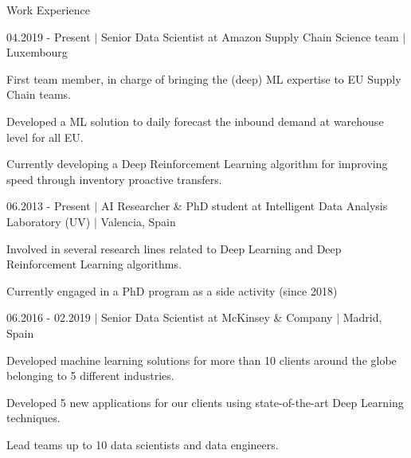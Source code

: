 \documentclass{resume} %
\begin{document}
\begin{rSection}{Work Experience} \itemsep -1pt
\begin{rSubsection}{04.2019 - Present $|$ Senior Data Scientist at Amazon Supply Chain Science team  $|$  \textnormal{Luxembourg}}{}{}

	\vspace{-3pt}

	\item First team member, in charge of bringing the (deep) ML expertise to EU Supply Chain teams.
	\item Developed a ML solution to daily forecast the inbound demand at warehouse level for all EU.
	\item Currently developing a Deep Reinforcement Learning algorithm for improving speed through inventory proactive transfers.
\end{rSubsection}


\vspace{-6pt}

\begin{rSubsection}{06.2013 - Present $|$ AI Researcher \& PhD student at Intelligent Data Analysis Laboratory (UV) $|$ \textnormal{Valencia, Spain}\hspace{-10pt}}{}{}

	\vspace{-3pt}

	\item Involved in several research lines related to Deep Learning and Deep Reinforcement Learning algorithms.
	\item Currently engaged in a PhD program as a side activity (since 2018)

\end{rSubsection}

\vspace{-6pt}

\begin{rSubsection}{06.2016 - 02.2019 $|$ Senior Data Scientist at McKinsey \& Company  $|$ \textnormal{Madrid, Spain}}{}{}

    \vspace{-3pt}

    \item Developed machine learning solutions for more than 10 clients around the globe belonging to 5 different industries.
    \item Developed 5 new applications for our clients using state-of-the-art Deep Learning techniques.
    \item Lead teams up to 10 data scientists and data engineers.
\end{rSubsection}


\end{rSection}
\end{document}
